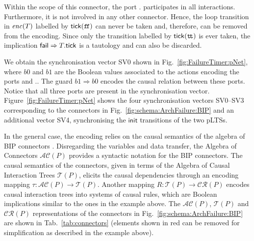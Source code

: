 \documentclass{llncs}
\newcommand{\fig}[1]{Fig.~\ref{fig:#1}}
\newcommand{\Fig}[1]{Figure~\ref{fig:#1}}
\newcommand{\tab}[1]{Tab.~\ref{tab:#1}}
\newcommand{\app}[1]{App.~\ref{secn:#1}}
\newcommand{\ndash}{--}
\newcommand{\true} {\ensuremath{\mathtt{t\!t}}}
\newcommand{\false}{\ensuremath{\mathtt{f\!f}}}
\newcommand{\init} {\ensuremath{\mathsf{init}}}
\newcommand{\ct}{\ensuremath{\mathcal{T}}}
\newcommand{\cru}{\ensuremath{\mathcal{CR}}}
\newcommand{\ac}{\ensuremath{\mathcal{AC}}}
\newcommand{\nopri}[1][]{\ensuremath{\mathit{enc}%
    \ifx#1\relax\else(#1)\fi}}
\begin{document}
Within the scope of this connector, the port {\NameTimer.\PortTick}
participates in all interactions.
%
Furthermore, it is not involved in any other
connector.  Hence, the loop transition in \nopri[\NameTimer]
labelled by $\PortTick(\false)$ can never be taken and, therefore, can
be removed from the encoding.  Since only the transition
labelled by $\PortTick(\true)$ is ever taken, 
%
the
implication $\mathsf{fail} \Rightarrow T.\mathsf{tick}$ is a tautology and can also be discarded.

We obtain the
synchronisation vector SV0 shown in \fig{FailureTimer:pNet}, where $b0$ and
$b1$ are the Boolean values associated to the actions encoding the
ports {\PortFail} and {\NameCtrl.\PortFail}.
The guard $b1 \Rightarrow b0$ encodes the causal
relation between these ports.  Notice
that %
all three ports are present in the
synchronisation vector.  \Fig{FailureTimer:pNet} shows
the four synchronisation vectors SV0\ndash SV3 corresponding to the
connectors in \fig{schema:ArchFailure:BIP} and an additional vector
SV4, synchronising the {\init} transitions of the two pLTSs.

In the general case, the encoding relies on the causal semantics of the
algebra of BIP connectors \cite{BliSif10-causal-fmsd}.  Disregarding
the variables and data transfer, the Algebra of Connectors $\ac(P)$
\cite{BliSif07-acp-emsoft} provides a syntactic notation for the BIP
connectors.  The causal semantics of the connectors, given in terms of
the Algebra of Causal Interaction Trees $\ct(P)$, elicits the
causal dependencies through an encoding mapping
$\tau: \ac(P) \rightarrow \ct(P)$.  Another mapping $R: \ct(P)
\rightarrow \cru(P)$ encodes causal interaction trees into systems of
causal rules, which are Boolean implications similar to the ones in
the example above.  %
The $\ac(P)$, $\ct(P)$ and $\cru(P)$
representations of the connectors in \fig{schema:ArchFailure:BIP} are
shown in \tab{connectors} (elements shown in red can be removed for
simplification as described in the example above).
\end{document}
